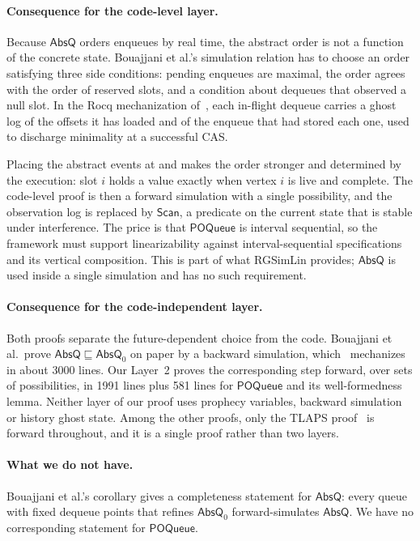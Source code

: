 \documentclass[11pt]{article}
\newcommand{\code}[1]{\texttt{\detokenize{#1}}}
\newcommand{\POQueue}{\mathsf{POQueue}}
\newcommand{\AbsQ}{\mathsf{AbsQ}}
\newcommand{\AbsQz}{\mathsf{AbsQ}_0}
\newcommand{\Scan}{\mathsf{Scan}}
\begin{document}
\paragraph{Consequence for the code-level layer.}
Because $\AbsQ$ orders enqueues by real time, the abstract order is not a
function of the concrete state.  Bouajjani et al.'s simulation relation has
to choose an order satisfying three side conditions: pending enqueues are
maximal, the order agrees with the order of reserved slots, and a
condition about dequeues that observed a null slot.  In the Rocq
mechanization of~\cite{ZGT26}, each in-flight dequeue carries a ghost log of
the offsets it has loaded and of the enqueue that had stored each one, used
to discharge minimality at a successful CAS.

Placing the abstract events at \code{inc} and \code{store} makes the order
stronger and determined by the execution: slot $i$ holds a value exactly
when vertex $i$ is live and complete.  The code-level proof is then a forward
simulation with a single possibility, and the observation log is replaced by
$\Scan$, a predicate on the current state that is stable under
interference.  The price is that $\POQueue$ is interval sequential, so the
framework must support linearizability against interval-sequential
specifications and its vertical composition.  This is part of what RGSimLin
provides; $\AbsQ$ is used inside a single simulation and has no such
requirement.

\paragraph{Consequence for the code-independent layer.}
Both proofs separate the future-dependent choice from the code.  Bouajjani
et al.\ prove $\AbsQ \sqsubseteq \AbsQz$ on paper by a backward simulation,
which~\cite{ZGT26} mechanizes in about 3000 lines.  Our Layer~2 proves the
corresponding step forward, over sets of possibilities, in 1991 lines plus
581 lines for $\POQueue$ and its well-formedness lemma.  Neither layer of our
proof uses prophecy variables, backward simulation or history ghost state.
Among the other proofs, only the TLAPS proof~\cite{JJYH24} is forward
throughout, and it is a single proof rather than two layers.

\paragraph{What we do not have.}
Bouajjani et al.'s corollary gives a completeness statement for $\AbsQ$:
every queue with fixed dequeue points that refines $\AbsQz$ forward-simulates
$\AbsQ$.  We have no corresponding statement for $\POQueue$.
\end{document}
